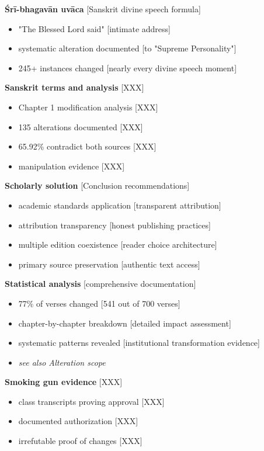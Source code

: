 \documentclass[11pt,twoside]{book}
\begin{document}
\textbf{\textbf{Śrī-bhagavān uvāca}} {[}Sanskrit divine speech formula]
\begin{itemize}
\item "The Blessed Lord said" [intimate address]
\item systematic alteration documented [to "Supreme Personality"]
\item 245+ instances changed [nearly every divine speech moment]
\end{itemize}

\textbf{\textbf{Sanskrit terms and analysis}} {[}XXX]
\begin{itemize}
\item Chapter 1 modification analysis [XXX]
\item 135 alterations documented [XXX]
\item 65.92\% contradict both sources [XXX]
\item manipulation evidence [XXX]
\end{itemize}

\textbf{\textbf{Scholarly solution}} {[}Conclusion recommendations]
\begin{itemize}
\item academic standards application [transparent attribution]
\item attribution transparency [honest publishing practices]
\item multiple edition coexistence [reader choice architecture]
\item primary source preservation [authentic text access]
\end{itemize}

\textbf{\textbf{Statistical analysis}} {[}comprehensive documentation]
\begin{itemize}
\item 77\% of verses changed [541 out of 700 verses]
\item chapter-by-chapter breakdown [detailed impact assessment]
\item systematic patterns revealed [institutional transformation evidence]
\item \emph{see also Alteration scope}
\end{itemize}

\textbf{\textbf{Smoking gun evidence}} {[}XXX]
\begin{itemize}
\item class transcripts proving approval [XXX]
\item documented authorization [XXX]
\item irrefutable proof of changes [XXX]
\end{itemize}
\end{document}
